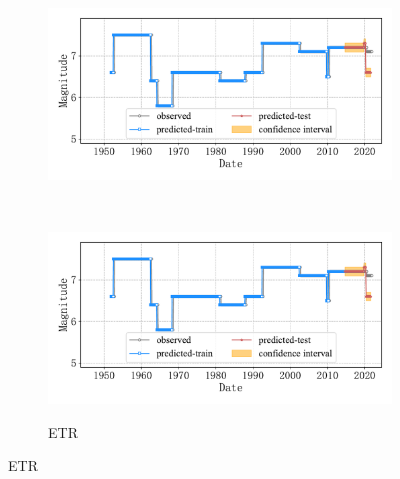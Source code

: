 \begin{figure}[!htbp]
\begin{subfigure}[b]{0.45\textwidth}
    \includegraphics[width=\textwidth]{Img/chap5_seism/split90/seism_kn_minyear_1932_maxyear_2021_spanlat_2_spanlon_4_timewindow_120_nextmonth_120_minmag_3.0_split_ratio_0.9_blocks1.pdf}
    \vspace{-1cm}
    \label{fig:seism_knn_minyear_1932_maxyear_2021_spanlat_2_spanlon_4_timewindow_120_nextmonth_120_minmag_3.0_split_ratio_0.9_blocks1}
  \end{subfigure}
  ~
  \begin{subfigure}[b]{0.45\textwidth}
    \caption{ETR}
    \vspace{-0.2cm}
    \includegraphics[width=\textwidth]{Img/chap5_seism/split90/seism_etr_minyear_1932_maxyear_2021_spanlat_2_spanlon_4_timewindow_120_nextmonth_120_minmag_3.0_split_ratio_0.9_blocks1.pdf}
    \vspace{-1cm}
    \label{fig:seism_etr_minyear_1932_maxyear_2021_spanlat_2_spanlon_4_timewindow_120_nextmonth_120_minmag_3.0_split_ratio_0.9_blocks1}
  \end{subfigure}
  \label{fig:seism_minyear_1932_maxyear_2021_spanlat_2_spanlon_4_timewindow_120_nextmonth_120_minmag_3.0_split_ratio_0.90_blocks1}
\end{figure}

